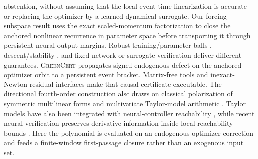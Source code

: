 \documentclass{article}
\newcommand{\method}{\textsc{GreenCert}}
\begin{document}
abstention, without assuming that the local event-time linearization is
accurate or replacing the optimizer by a learned dynamical surrogate.  Our forcing-subspace result uses the exact
scaled-momentum factorization to close the anchored nonlinear recurrence in
parameter space before transporting it through persistent neural-output
margins.
Robust training/parameter balls \citep{sosnin2026agt,taheri2026barc,weng2020weight},
descent/stability \citep{streeter2022autobound,shi2026ctbab}, and fixed-network
or surrogate verification \citep{wicker2021iterative,mathiesen2026certified,naughton2026certified}
deliver different guarantees.  \method{} propagates signed endogenous defect
on the anchored optimizer orbit to a persistent event bracket.  Matrix-free tools
\citep{pearlmutter1994hvp,kuczynski1992random} and inexact-Newton residual
interfaces \citep{dembo1982inexact} make that causal certificate executable.
The directional fourth-order construction also draws on classical
polarization of symmetric multilinear forms \citep{thomas2014polarization}
and multivariate Taylor-model arithmetic \citep{berz1998taylor}.  Taylor
models have also been integrated with neural-controller reachability
\citep{schilling2022taylor}, while recent neural verification preserves
derivative information inside local reachability bounds
\citep{sharifi2024hessian,entesari2026taylor}.  Here the
polynomial is evaluated on an endogenous optimizer correction and feeds a
finite-window first-passage closure rather than an exogenous input set.
\end{document}
